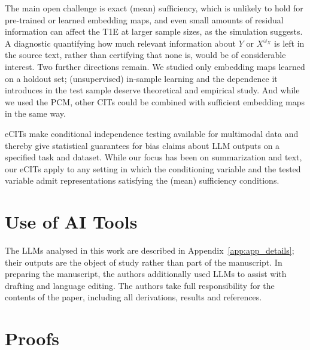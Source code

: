 \documentclass[twoside,11pt]{article}
\begin{document}
The main open challenge is exact (mean) sufficiency, which is unlikely to hold for pre-trained or learned embedding maps, and even small amounts of residual information can affect the T1E at larger sample sizes, as the simulation suggests. A diagnostic quantifying how much relevant information about $Y$ or $X^{\omega_X}$  is left in the source text, rather than certifying that none is, would be of considerable interest.
Two further directions remain. We studied only embedding maps learned on a holdout set; (unsupervised) in-sample learning and the dependence it introduces in the test sample deserve theoretical and empirical study. 
And while we used the PCM, %
other CITs could be combined with sufficient embedding maps in the same way.

eCITs make conditional independence testing available for multimodal data and thereby give statistical guarantees for bias claims about LLM outputs on a specified task and dataset. While our focus has been on summarization and text, our eCITs apply to any setting in which the conditioning variable and the tested variable admit representations satisfying the (mean) sufficiency conditions.



\section*{Use of AI Tools}

The LLMs analysed in this work are described in Appendix~\ref{app:app_details}; their outputs are the object of study rather than part of the manuscript. 
In preparing the manuscript, the authors additionally used LLMs to assist with drafting and language editing. The authors take full responsibility for the contents of the paper, including all derivations, results and references.


\clearpage
\newpage

\appendix

\section{Proofs}\label{app:proofs}
\end{document}
